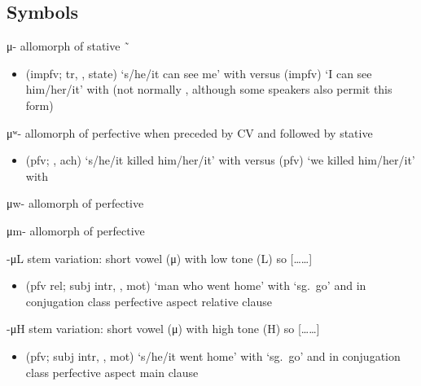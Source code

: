 \subsection{Symbols}\label{sec:alphalist-sym}
\begin{morphdesc}[resume*=alphalist]
\item[μ-]\label{m:μ-}
	allomorph of stative  \~\ 
	\begin{itemize}
	\item	{} (impfv; tr, ,  state) ‘s/he/it can see me’
			with \newline
		versus  (impfv) ‘I can see him/her/it’
			with \newline
		(not normally , although some speakers also permit this form)
	\end{itemize}

\item[μʷ-]\label{m:μʷ-}
	allomorph of perfective  when preceded by CV and followed by stative 
	\begin{itemize}
	\item	{} (pfv; , ach) ‘s/he/it killed him/her/it’
			with \newline
		versus  (pfv) ‘we killed him/her/it’
			with 
	\end{itemize}

\item[μw-]\label{m:μw-}
	allomorph of perfective 

\item[μm-]\label{m:μm-}
	allomorph of perfective 

\item[-μL]\label{m:-μL}
	stem variation: short vowel (μ) with low tone (L) so [……]
	\begin{itemize}
	\item	{} (pfv rel; subj intr, , mot) ‘man who went home’
		with  ‘sg.\ go’ and 
		in  conjugation class perfective aspect relative clause
	\end{itemize}

\item[-μH]\label{m:-μH}
	stem variation: short vowel (μ) with high tone (H) so [……]
	\begin{itemize}
	\item	{} (pfv; subj intr, , mot) ‘s/he/it went home’
		with  ‘sg.\ go’ and 
		in  conjugation class perfective aspect main clause
	\end{itemize}


\end{morphdesc}
